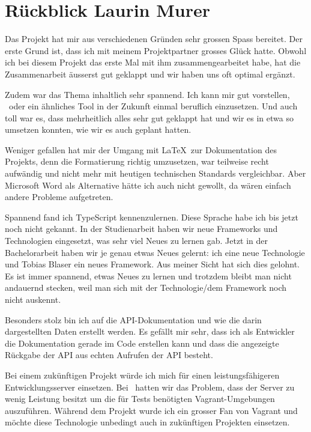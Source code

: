 \section*{Rückblick Laurin Murer}
	Das Projekt hat mir aus verschiedenen Gründen sehr grossen Spass bereitet.
	Der erste Grund ist, dass ich mit meinem Projektpartner grosses Glück hatte.
	Obwohl ich bei diesem Projekt das erste Mal mit ihm zusammengearbeitet habe,
	hat die Zusammenarbeit äusserst gut geklappt und wir haben uns oft optimal ergänzt.
	
	Zudem war das Thema inhaltlich sehr spannend.
	Ich kann mir gut vorstellen, \eeppi\ oder ein ähnliches Tool in der Zukunft einmal beruflich einzusetzen.
	Und auch toll war es, dass mehrheitlich alles sehr gut geklappt hat und wir es in etwa so umsetzen konnten, wie wir es auch geplant hatten.
	
	Weniger gefallen hat mir der Umgang mit \LaTeX\ zur Dokumentation des Projekts,
	denn die Formatierung richtig umzusetzen, war teilweise recht aufwändig
	und nicht mehr mit heutigen technischen Standards vergleichbar.
	Aber Microsoft Word als Alternative hätte ich auch nicht gewollt, da wären einfach andere Probleme aufgetreten.
	
	Spannend fand ich TypeScript kennenzulernen. Diese Sprache habe ich bis jetzt noch nicht gekannt.
	In der Studienarbeit haben wir neue Frameworks und Technologien eingesetzt, was sehr viel Neues zu lernen gab.
	Jetzt in der Bachelorarbeit haben wir je genau etwas Neues gelernt: ich eine neue Technologie und Tobias Blaser ein neues Framework.
	Aus meiner Sicht hat sich dies gelohnt. Es ist immer spannend, etwas Neues zu lernen
	und trotzdem bleibt man nicht andauernd stecken, weil man sich mit der Technologie/dem Framework noch nicht auskennt.
	
	Besonders stolz bin ich auf die API-Dokumentation und wie die darin dargestellten Daten erstellt werden.
	Es gefällt mir sehr, dass ich als Entwickler die Dokumentation gerade im Code erstellen kann
	und dass die angezeigte Rückgabe der API aus echten Aufrufen der API besteht.
	
	Bei einem zukünftigen Projekt würde ich mich für einen leistungsfähigeren Entwicklungsserver einsetzen.
	Bei \eeppi\ hatten wir das Problem, dass der Server zu wenig Leistung besitzt um die für Tests benötigten Vagrant-Umgebungen auszuführen.
	Während dem Projekt wurde ich ein grosser Fan von Vagrant und möchte diese Technologie unbedingt auch in zukünftigen Projekten einsetzen.
